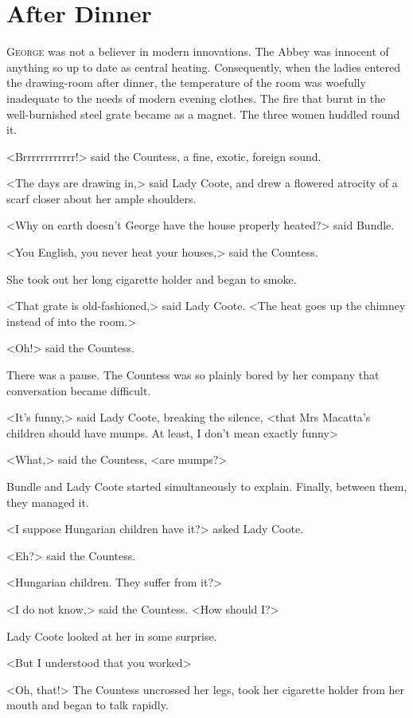 \chapter{After Dinner}

\lettrine{G}{eorge} was not a believer in modern innovations. The Abbey was innocent of anything so up to date as central heating. Consequently, when the ladies entered the drawing-room after dinner, the temperature of the room was woefully inadequate to the needs of modern evening clothes. The fire that burnt in the well-burnished steel grate became as a magnet. The three women huddled round it.

<Brrrrrrrrrrrr!> said the Countess, a fine, exotic, foreign sound.

<The days are drawing in,> said Lady Coote, and drew a flowered atrocity of a scarf closer about her ample shoulders.

<Why on earth doesn't George have the house properly heated?> said Bundle.

<You English, you never heat your houses,> said the Countess.

She took out her long cigarette holder and began to smoke.

<That grate is old-fashioned,> said Lady Coote. <The heat goes up the chimney instead of into the room.>

<Oh!> said the Countess.

There was a pause. The Countess was so plainly bored by her company that conversation became difficult.

<It's funny,> said Lady Coote, breaking the silence, <that Mrs Macatta's children should have mumps. At least, I don't mean exactly funny\longdash>

<What,> said the Countess, <are mumps?>

Bundle and Lady Coote started simultaneously to explain. Finally, between them, they managed it.

<I suppose Hungarian children have it?> asked Lady Coote.

<Eh?> said the Countess.

<Hungarian children. They suffer from it?>

<I do not know,> said the Countess. <How should I?>

Lady Coote looked at her in some surprise.

<But I understood that you worked\longdash>

<Oh, that!> The Countess uncrossed her legs, took her cigarette holder from her mouth and began to talk rapidly.

